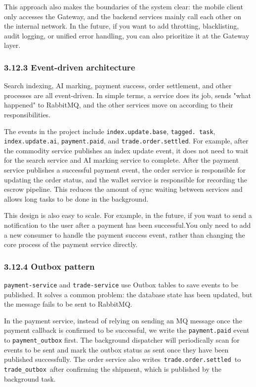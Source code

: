 \documentclass{article}
\begin{document}
This approach also makes the boundaries of the system clear: the mobile client only accesses the Gateway, and the backend services mainly call each other on the internal network. In the future, if you want to add throtting, blacklisting, audit logging, or unified error handling, you can also prioritize it at the Gateway layer.

\subsubsection{3.12.3 Event-driven architecture}

Search indexing, AI marking, payment success, order settlement, and other processes are all event-driven. In simple terms, a service does its job, sends "what happened" to RabbitMQ, and the other services move on according to their responsibilities.

The events in the project include \texttt{index.update.base}, \texttt{tagged. task}, \texttt{index.update.ai}, \texttt{payment.paid}, and \texttt{trade.order.settled}. For example, after the commodity service publishes an index update event, it does not need to wait for the search service and AI marking service to complete. After the payment service publishes a successful payment event, the order service is responsible for updating the order status, and the wallet service is responsible for recording the escrow pipeline. This reduces the amount of sync waiting between services and allows long tasks to be done in the background.

This design is also easy to scale. For example, in the future, if you want to send a notification to the user after a payment has been successful.You only need to add a new consumer to handle the payment success event, rather than changing the core process of the payment service directly.

\subsubsection{3.12.4 Outbox pattern}

\texttt{payment-service} and \texttt{trade-service} use Outbox tables to save events to be published. It solves a common problem: the database state has been updated, but the message fails to be sent to RabbitMQ.

In the payment service, instead of relying on sending an MQ message once the payment callback is confirmed to be successful, we write the \texttt{payment.paid} event to \texttt{payment\_outbox} first. The background dispatcher will periodically scan for events to be sent and mark the outbox status as sent once they have been published successfully. The order service also writes\texttt{ trade.order.settled }to\texttt{ trade\_outbox }after confirming the shipment, which is published by the background task.
\end{document}
